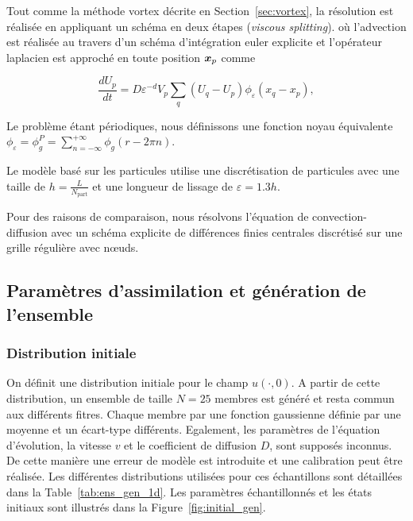 Tout comme la méthode vortex décrite en Section~\ref{sec:vortex}, la résolution est réalisée en appliquant un schéma en deux étapes (\textit{viscous splitting}). où l'advection est réalisée au travers d'un schéma d'intégration euler explicite et l'opérateur laplacien est approché en toute position $\bm{x}_p$ comme

\begin{equation*}
    \frac{dU_p}{dt} = D \varepsilon^{-d} V_p \sum_q (U_q - U_p) \phi_\varepsilon(x_q -  x_p),
\end{equation*}

Le problème étant périodiques, nous définissons une fonction noyau équivalente $\phi_\varepsilon = \phi^P_g = \sum_{n=-\infty}^{+\infty} \phi_g(r - 2 \pi n)$.

Le modèle basé sur les particules utilise une discrétisation de \npart{} particules avec une taille de $h = \frac{L}{N_{\text{part}}}$ et une longueur de lissage de $\varepsilon = 1.3 h$.

Pour des raisons de comparaison, nous résolvons l'équation de convection-diffusion avec un schéma explicite de différences finies centrales discrétisé sur une grille régulière avec \ngrid{} nœuds.

\subsection{Paramètres d'assimilation et génération de l'ensemble}

\subsubsection{Distribution initiale}

On définit une distribution initiale pour le champ $u(\cdot, 0)$. A partir de cette distribution, un ensemble de taille  $N = 25$ membres est généré et resta commun aux différents fitres. Chaque membre par une fonction gaussienne définie par une moyenne et un écart-type différents. Egalement, les paramètres de l'équation d'évolution, la vitesse \(v\) et le coefficient de diffusion \(D\),  sont supposés inconnus. De cette manière une erreur de modèle est introduite et une calibration peut être réalisée. Les différentes distributions utilisées pour ces échantillons sont détaillées dans la Table~\ref{tab:ens_gen_1d}. Les paramètres échantillonnés et les états initiaux sont illustrés dans la Figure~\ref{fig:initial_gen}.

